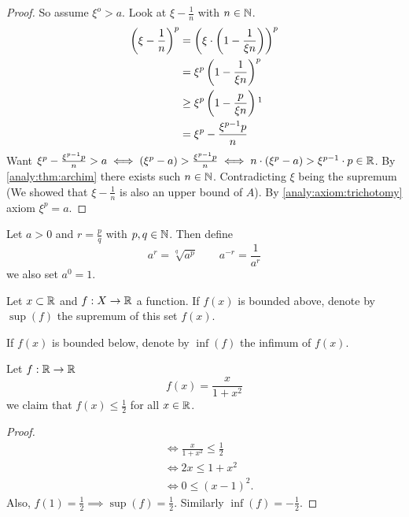 \documentclass[10pt, a4paper]{article}
\begin{document}
\begin{theorem}
\begin{proof}
        So assume $\xi ^ o > a$.
        Look at $\xi - \frac{1}{n}$ with $n \in \mathbb{N}$.
        \begin{align*}
            \left(\xi - \frac{1}{n}\right) ^ p &= \left(\xi \cdot\left(1 - \frac{1}{\xi n}\right)\right) ^ p \\
            &= \xi ^ p \left(1 - \frac{1}{\xi n}\right) ^ p \\
            &\geq \xi ^ p \left(1 - \frac{p}{\xi n}\right)\footnotemark \\
            &= \xi ^ p - \frac{\xi ^ {p - 1}p}{n}
        \end{align*}
        Want $\xi ^ p - \frac{\xi ^ {p - 1}p}{n} > a \iff (\xi ^ p - a) > \frac{\xi ^ {p - 1}p}{n} \iff n \cdot (\xi ^ p - a) > \xi ^ {p - 1} \cdot p \in \mathbb{R}$.
        By \autoref{analy:thm:archim} there exists such $n \in \mathbb{N}$.
        Contradicting $\xi$ being the supremum (We showed that $\xi - \frac{1}{n}$ is also an upper bound of $A$).
        By \autoref{analy:axiom:trichotomy} axiom $\xi ^ p = a$.
        \end{proof}
\end{theorem}

\begin{definition}
    Let $a > 0$ and $r = \frac{p}{q}$ with $p, q \in \mathbb{N}$. Then define
    \[
    a ^ r = \sqrt[q]{a ^ p}\qquad a ^ {-r} = \frac{1}{a ^ r}
    \]
    we also set $a ^ 0 = 1$.
\end{definition}

\begin{definition}
    Let $x \subset \mathbb{R}$ and $f : X \rightarrow \mathbb{R}$ a function.
    If $f(x)$ is bounded above,
    denote by $\sup(f)$ the supremum of this set $f(x)$.

    If $f(x)$ is bounded below,
    denote by $\inf(f)$ the infimum of $f(x)$.
\end{definition}

\begin{example}
    Let $f : \mathbb{R} \rightarrow \mathbb{R}$
    \[
    f(x) = \frac{x}{1 + x ^ 2}
    \]
    we claim that $f(x) \leq \frac{1}{2}$ for all $x \in \mathbb{R}$.
    \begin{proof}
        \begin{align*}
            &\iff \frac{x}{1 + x ^ 2} \leq \frac{1}{2} \\
            &\iff 2x \leq 1 + x ^ 2 \\
            &\iff  0 \leq (x - 1) ^ 2.
        \end{align*}
        Also, $f(1) = \frac{1}{2} \implies \sup(f) = \frac{1}{2}$.
        Similarly $\inf(f) = -\frac{1}{2}$.
    \end{proof}
\end{example}
\end{document}
